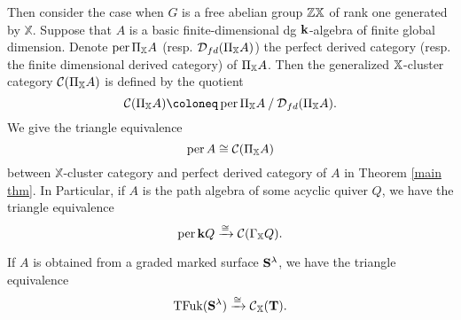 Then consider the case when $G$ is a free abelian group $\mathbb{Z} \mathbb{X}$
of rank one generated by $\mathbb{X}$.
Suppose that $A$ is a basic finite-dimensional
dg $\mathbf{k}$-algebra of finite global dimension.
Denote $\operatorname{per}\Pi_{\mathbb{X}}A$ (resp. $\operatorname{\mathcal{D}}_{fd}(\Pi_{\mathbb{X}}A)$)
the perfect derived category (resp. the finite dimensional derived category)
of $\Pi_{\mathbb{X}}A$.
Then the generalized $\mathbb{X}$-cluster category $\operatorname{\mathcal{C}}(\Pi_{\mathbb{X}}A)$
is defined by the quotient
\[
  \Ce(\Pi_{\XX}A) \coloneq \per \Pi_{\XX} A \quot \D_{fd}(\Pi_{\XX}A).
\]
We give the triangle equivalence
\begin{equation}\label{main}
  \operatorname{per} A \cong \operatorname{\mathcal{C}}(\Pi_{\mathbb{X}}A)
\end{equation}
between $\mathbb{X}$-cluster category and perfect derived category of $A$
in Theorem \ref{main thm}.
In Particular, if $A$ is the path algebra of some acyclic quiver $Q$,
we have the triangle equivalence \cite[Theorem 6.7]{Q1}
\[
  \operatorname{per} \mathbf{k} Q \xrightarrow{\cong} \operatorname{\mathcal{C}}(\Gamma_{\mathbb{X}}Q).
\]

If $A$ is obtained from a graded marked surface $\mathbf{S}^{\lambda}$,
we have the triangle equivalence \cite[Theorem 4.7]{Q12}
\[
  \operatorname{TFuk}(\mathbf{S}^{\lambda}) \xrightarrow{\cong} \operatorname{\mathcal{C}}_{\mathbb{X}}(\mathbf{T}).
\]
